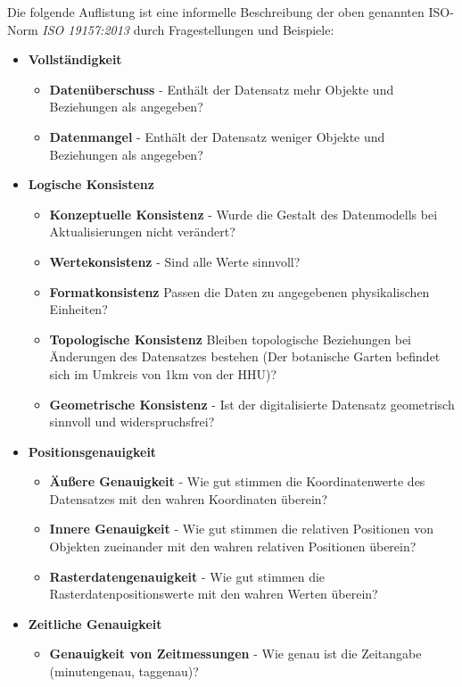 \documentclass[11pt,ceqn]{book}
\begin{document}
Die folgende Auflistung ist eine informelle Beschreibung der oben genannten ISO-Norm \textit{ISO 19157:2013} durch Fragestellungen und Beispiele:

\begin{itemize}
\item \textbf{Vollständigkeit}
\begin{itemize}
\item \textbf{Datenüberschuss} -
Enthält der Datensatz mehr Objekte und Beziehungen als angegeben?
\item \textbf{Datenmangel} - Enthält der Datensatz weniger Objekte und Beziehungen als angegeben?
\end{itemize}
\item \textbf{Logische Konsistenz}
\begin{itemize}
\item \textbf{Konzeptuelle Konsistenz} - 
Wurde die Gestalt des Datenmodells bei Aktualisierungen nicht verändert?
\item \textbf{Wertekonsistenz} - Sind alle Werte sinnvoll?
\item \textbf{Formatkonsistenz} Passen die Daten zu angegebenen physikalischen Einheiten?
\item \textbf{Topologische Konsistenz} 
Bleiben topologische Beziehungen bei Änderungen des Datensatzes bestehen (Der botanische Garten befindet sich im Umkreis von 1km von der HHU)?
\item \textbf{Geometrische Konsistenz} - Ist der digitalisierte Datensatz geometrisch sinnvoll und widerspruchsfrei?
\end{itemize}
\item \textbf{Positionsgenauigkeit}
\begin{itemize}
\item
\textbf{Äußere Genauigkeit} - Wie gut stimmen die Koordinatenwerte des Datensatzes mit den wahren Koordinaten überein?
\item \textbf{Innere Genauigkeit} - Wie gut stimmen die relativen Positionen von Objekten zueinander mit den wahren relativen Positionen überein?
\item \textbf{Rasterdatengenauigkeit} - Wie gut stimmen die Rasterdatenpositionswerte mit den wahren Werten überein?
\end{itemize}
\item \textbf{Zeitliche Genauigkeit}
\begin{itemize}
\item
\textbf{Genauigkeit von Zeitmessungen} - 
Wie genau ist die Zeitangabe (minutengenau, taggenau)?

\end{itemize}
\end{itemize}
\end{document}
